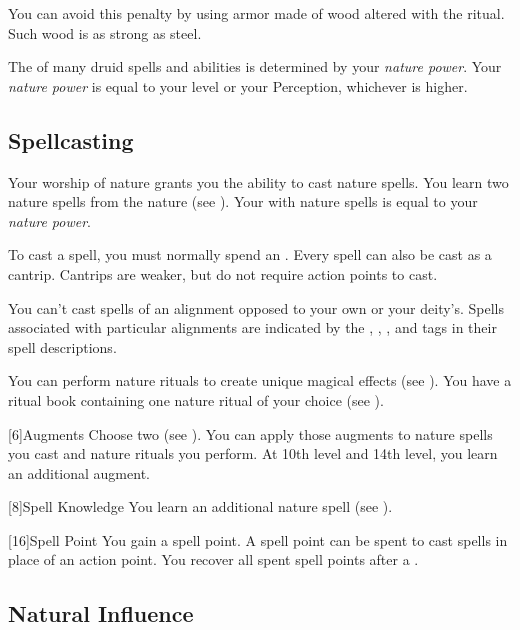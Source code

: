         You can avoid this penalty by using armor made of wood altered with the  ritual.
        Such wood is as strong as steel.

        The  of many druid spells and abilities is determined by your \textit{nature power}.
        Your \textit{nature power} is equal to your level or your Perception, whichever is higher.

    \subsection{Spellcasting}

        Your worship of nature grants you the ability to cast nature spells.
        You learn two nature spells from the nature  (see ).
        Your  with nature spells is equal to your \textit{nature power}.

        To cast a spell, you must normally spend an .
        Every spell can also be cast as a cantrip.
        Cantrips are weaker, but do not require action points to cast.

        You can't cast spells of an alignment opposed to your own or your deity's.
        Spells associated with particular alignments are indicated by the , , , and  tags in their spell descriptions.

        You can perform nature rituals to create unique magical effects (see ).
        You have a ritual book containing one nature ritual of your choice (see ).

        [6]{Augments}
        Choose two  (see ).
        You can apply those augments to nature spells you cast and nature rituals you perform.
        At 10th level and 14th level, you learn an additional augment.

        [8]{Spell Knowledge}
        You learn an additional nature spell (see ).

        [16]{Spell Point} 
        You gain a spell point.
        A spell point can be spent to cast spells in place of an action point.
        You recover all spent spell points after a .

    \subsection{Natural Influence}

